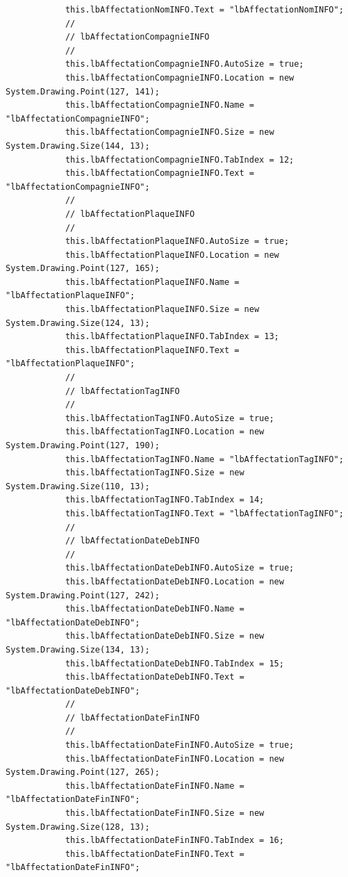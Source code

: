 \documentclass[main.tex]{subfiles}
\begin{document}
\begin{lstlisting}
            this.lbAffectationNomINFO.Text = "lbAffectationNomINFO";
            // 
            // lbAffectationCompagnieINFO
            // 
            this.lbAffectationCompagnieINFO.AutoSize = true;
            this.lbAffectationCompagnieINFO.Location = new System.Drawing.Point(127, 141);
            this.lbAffectationCompagnieINFO.Name = "lbAffectationCompagnieINFO";
            this.lbAffectationCompagnieINFO.Size = new System.Drawing.Size(144, 13);
            this.lbAffectationCompagnieINFO.TabIndex = 12;
            this.lbAffectationCompagnieINFO.Text = "lbAffectationCompagnieINFO";
            // 
            // lbAffectationPlaqueINFO
            // 
            this.lbAffectationPlaqueINFO.AutoSize = true;
            this.lbAffectationPlaqueINFO.Location = new System.Drawing.Point(127, 165);
            this.lbAffectationPlaqueINFO.Name = "lbAffectationPlaqueINFO";
            this.lbAffectationPlaqueINFO.Size = new System.Drawing.Size(124, 13);
            this.lbAffectationPlaqueINFO.TabIndex = 13;
            this.lbAffectationPlaqueINFO.Text = "lbAffectationPlaqueINFO";
            // 
            // lbAffectationTagINFO
            // 
            this.lbAffectationTagINFO.AutoSize = true;
            this.lbAffectationTagINFO.Location = new System.Drawing.Point(127, 190);
            this.lbAffectationTagINFO.Name = "lbAffectationTagINFO";
            this.lbAffectationTagINFO.Size = new System.Drawing.Size(110, 13);
            this.lbAffectationTagINFO.TabIndex = 14;
            this.lbAffectationTagINFO.Text = "lbAffectationTagINFO";
            // 
            // lbAffectationDateDebINFO
            // 
            this.lbAffectationDateDebINFO.AutoSize = true;
            this.lbAffectationDateDebINFO.Location = new System.Drawing.Point(127, 242);
            this.lbAffectationDateDebINFO.Name = "lbAffectationDateDebINFO";
            this.lbAffectationDateDebINFO.Size = new System.Drawing.Size(134, 13);
            this.lbAffectationDateDebINFO.TabIndex = 15;
            this.lbAffectationDateDebINFO.Text = "lbAffectationDateDebINFO";
            // 
            // lbAffectationDateFinINFO
            // 
            this.lbAffectationDateFinINFO.AutoSize = true;
            this.lbAffectationDateFinINFO.Location = new System.Drawing.Point(127, 265);
            this.lbAffectationDateFinINFO.Name = "lbAffectationDateFinINFO";
            this.lbAffectationDateFinINFO.Size = new System.Drawing.Size(128, 13);
            this.lbAffectationDateFinINFO.TabIndex = 16;
            this.lbAffectationDateFinINFO.Text = "lbAffectationDateFinINFO";

\end{lstlisting}
\end{document}
